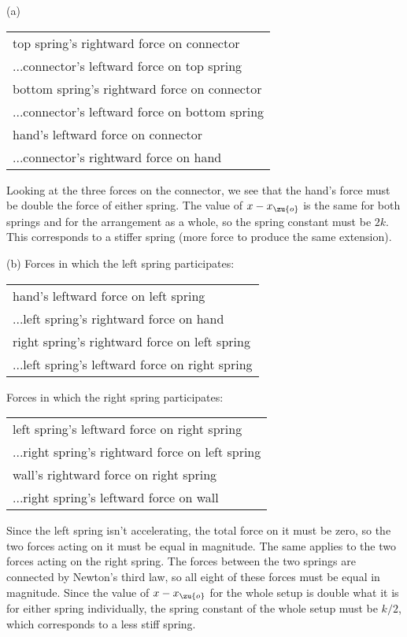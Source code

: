
(a)

\begin{tabular}{l}
   top spring's rightward force on connector\\
    ...connector's leftward force on top spring\\
   bottom spring's rightward force on connector\\
    ...connector's leftward force on bottom spring\\
   hand's leftward force on connector\\
    ...connector's rightward force on hand
\end{tabular}

Looking at the three forces on the connector, we see that
the hand's force must be double the force of either spring.
The value of $x-x_\zu{o}$ is the same for both springs and for
the arrangement as a whole, so the spring constant must be
$2k$. This corresponds to a stiffer spring (more force to
produce the same extension).

(b) Forces in which the left spring participates:

\begin{tabular}{l}
   hand's leftward force on left spring\\
    ...left spring's rightward force on hand\\
   right spring's rightward force on left spring\\
    ...left spring's leftward force on right spring
\end{tabular}

Forces in which the right spring participates:

\begin{tabular}{l}
   left spring's leftward force on right spring\\
    ...right spring's rightward force on left spring\\
   wall's rightward force on right spring\\
    ...right spring's leftward force on wall
\end{tabular}

Since the left spring isn't accelerating, the total force on
it must be zero, so the two forces acting on it must be
equal in magnitude. The same applies to the two forces
acting on the right spring. The forces between the two
springs are connected by Newton's third law, so all eight of
these forces must be equal in magnitude. Since the value of
$x-x_\zu{o}$ for the whole setup is double what it is for either
spring individually, the spring constant of the whole setup
must be $k/2$, which corresponds to a less stiff spring.



